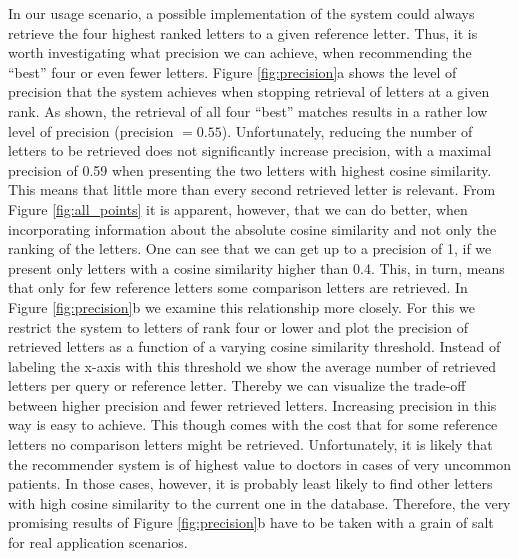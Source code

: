 In our usage scenario, a possible implementation of the system could always retrieve the four highest ranked letters to a given reference letter. Thus, it is worth investigating what precision we can achieve, when recommending the ``best'' four or even fewer letters. Figure \ref{fig:precision}a shows the level of precision that the system achieves when stopping retrieval of letters at a given rank. As shown, the retrieval of all four ``best'' matches results in a rather low level of precision (precision $= 0.55$). Unfortunately, reducing the number of letters to be retrieved does not significantly increase precision, with a maximal precision of 0.59 when presenting the two letters with highest cosine similarity. This means that little more than every second retrieved letter is relevant. From Figure \ref{fig:all_points} it is apparent, however, that we can do better, when incorporating information about the absolute cosine similarity and not only the ranking of the letters. One can see that we can get up to a precision of 1, if we present only letters with a cosine similarity higher than 0.4. This, in turn, means that only for few reference letters some comparison letters are retrieved. In Figure \ref{fig:precision}b we examine this relationship more closely. For this we restrict the system to letters of rank four or lower and plot the precision of retrieved letters as a function of a varying cosine similarity threshold. Instead of labeling the x-axis with this threshold we show the average number of retrieved letters per query or reference letter. Thereby we can visualize the trade-off between higher precision and fewer retrieved letters. Increasing precision in this way is easy to achieve. This though comes with the cost that for some reference letters no comparison letters might be retrieved. Unfortunately, it is likely that the recommender system is of highest value to doctors in cases of very uncommon patients. In those cases, however, it is probably least likely to find other letters with high cosine similarity to the current one in the database. Therefore, the very promising results of Figure \ref{fig:precision}b have to be taken with a grain of salt for real application scenarios.

